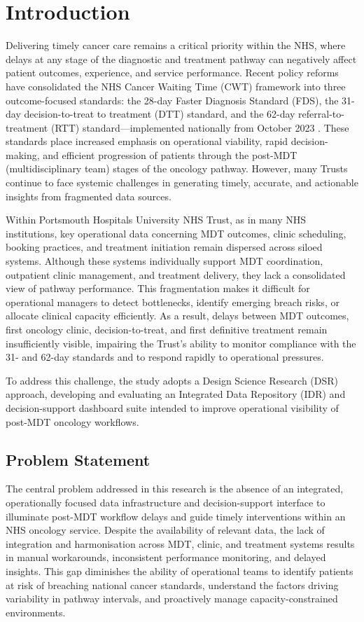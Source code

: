 \chapter{Introduction}
Delivering timely cancer care remains a critical priority within the NHS, where delays at any stage of the diagnostic and treatment pathway can negatively affect patient outcomes, experience, and service performance. Recent policy reforms have consolidated the NHS Cancer Waiting Time (CWT) framework into three outcome-focused standards: the 28-day Faster Diagnosis Standard (FDS), the 31-day decision-to-treat to treatment (DTT) standard, and the 62-day referral-to-treatment (RTT) standard—implemented nationally from October 2023 \citep{johnson2024, NHSDigital2026}. These standards place increased emphasis on operational viability, rapid decision-making, and efficient progression of patients through the post-MDT (multidisciplinary team) stages of the oncology pathway. However, many Trusts continue to face systemic challenges in generating timely, accurate, and actionable insights from fragmented data sources.

Within Portsmouth Hospitals University NHS Trust, as in many NHS institutions, key operational data concerning MDT outcomes, clinic scheduling, booking practices, and treatment initiation remain dispersed across siloed systems. Although these systems individually support MDT coordination, outpatient clinic management, and treatment delivery, they lack a consolidated view of pathway performance. This fragmentation makes it difficult for operational managers to detect bottlenecks, identify emerging breach risks, or allocate clinical capacity efficiently. As a result, delays between MDT outcomes, first oncology clinic, decision-to-treat, and first definitive treatment remain insufficiently visible, impairing the Trust's ability to monitor compliance with the 31- and 62-day standards and to respond rapidly to operational pressures.

To address this challenge, the study adopts a Design Science Research (DSR) approach, developing and evaluating an Integrated Data Repository (IDR) and decision-support dashboard suite intended to improve operational visibility of post-MDT oncology workflows.

\section{Problem Statement}

The central problem addressed in this research is the absence of an integrated, operationally focused data infrastructure and decision-support interface to illuminate post-MDT workflow delays and guide timely interventions within an NHS oncology service. Despite the availability of relevant data, the lack of integration and harmonisation across MDT, clinic, and treatment systems results in manual workarounds, inconsistent performance monitoring, and delayed insights. This gap diminishes the ability of operational teams to identify patients at risk of breaching national cancer standards, understand the factors driving variability in pathway intervals, and proactively manage capacity-constrained environments.

